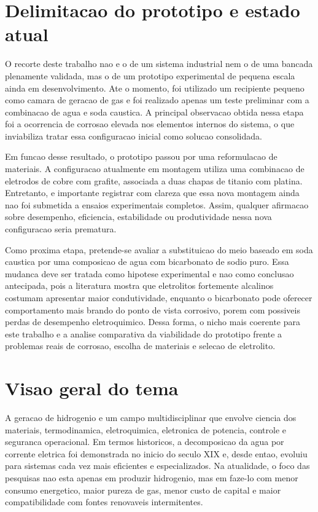 \documentclass[12pt,oneside,a4paper,english,brazilian]{abntex2}
\begin{document}
\section{Delimitacao do prototipo e estado atual}

O recorte deste trabalho nao e o de um sistema industrial nem o de uma bancada plenamente validada, mas o de um prototipo experimental de pequena escala ainda em desenvolvimento. Ate o momento, foi utilizado um recipiente pequeno como camara de geracao de gas e foi realizado apenas um teste preliminar com a combinacao de agua e soda caustica. A principal observacao obtida nessa etapa foi a ocorrencia de corrosao elevada nos elementos internos do sistema, o que inviabiliza tratar essa configuracao inicial como solucao consolidada.

Em funcao desse resultado, o prototipo passou por uma reformulacao de materiais. A configuracao atualmente em montagem utiliza uma combinacao de eletrodos de cobre com grafite, associada a duas chapas de titanio com platina. Entretanto, e importante registrar com clareza que essa nova montagem ainda nao foi submetida a ensaios experimentais completos. Assim, qualquer afirmacao sobre desempenho, eficiencia, estabilidade ou produtividade nessa nova configuracao seria prematura.

Como proxima etapa, pretende-se avaliar a substituicao do meio baseado em soda caustica por uma composicao de agua com bicarbonato de sodio puro. Essa mudanca deve ser tratada como hipotese experimental e nao como conclusao antecipada, pois a literatura mostra que eletrolitos fortemente alcalinos costumam apresentar maior condutividade, enquanto o bicarbonato pode oferecer comportamento mais brando do ponto de vista corrosivo, porem com possiveis perdas de desempenho eletroquimico. Dessa forma, o nicho mais coerente para este trabalho e a analise comparativa da viabilidade do prototipo frente a problemas reais de corrosao, escolha de materiais e selecao de eletrolito.

\section{Visao geral do tema}

A geracao de hidrogenio e um campo multidisciplinar que envolve ciencia dos materiais, termodinamica, eletroquimica, eletronica de potencia, controle e seguranca operacional. Em termos historicos, a decomposicao da agua por corrente eletrica foi demonstrada no inicio do seculo XIX e, desde entao, evoluiu para sistemas cada vez mais eficientes e especializados. Na atualidade, o foco das pesquisas nao esta apenas em produzir hidrogenio, mas em faze-lo com menor consumo energetico, maior pureza de gas, menor custo de capital e maior compatibilidade com fontes renovaveis intermitentes.
\end{document}
